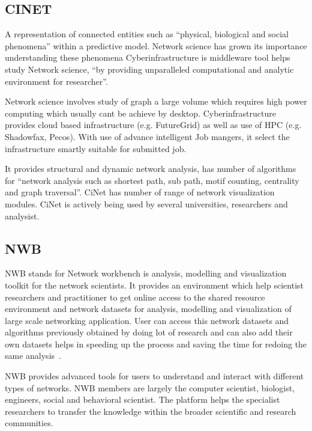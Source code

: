  \pv

\subsection{CINET}

    A representation of connected entities such as ``physical,
    biological and social phenomena'' within a predictive
    model\cite{www-bi-vt-edu}. Network science has grown its importance understanding
    these phenomena Cyberinfrastructure is middleware tool helps study
    Network science,
    ``by providing unparalleled computational and analytic environment
    for researcher''\cite{www-portal-futuresystems-org-projects-233}.
 
    Network science involves study of graph a large volume which
    requires high power computing which usually cant be achieve by
    desktop. Cyberinfrastructure provides cloud based infrastructure
    (e.g. FutureGrid) as well as use of HPC (e.g. Shadowfax,
    Pecos). With use of advance intelligent Job mangers, it select the
    infrastructure smartly suitable for submitted job.
     
    It provides structural and dynamic network analysis, has number of
    algorithms for ``network analysis such as shortest path, sub path,
    motif counting, centrality and graph traversal''. CiNet has number
    of range of network visualization modules.  CiNet is actively
    being used by several universities, researchers and analysist.

    \pv

\subsection{NWB}

NWB stands for Network workbench is analysis, modelling and
visualization toolkit for the network scientists.  It provides an
environment which help scientist researchers and practitioner to get
online access to the shared resource environment and network datasets
for analysis, modelling and visualization of large scale networking
application.  User can access this network datasets and algorithms
previously obtained by doing lot of research and can also add their
own datasets helps in speeding up the process and saving the time for
redoing the same analysis~\cite{www-nwb.edu}.

    NWB provides advanced tools for users to understand and interact
    with different types of networks.  NWB members are largely the
    computer scientist, biologist, engineers, social and behavioral
    scientist. The platform helps the specialist researchers to
    transfer the knowledge within the broader scientific and research
    communities.

